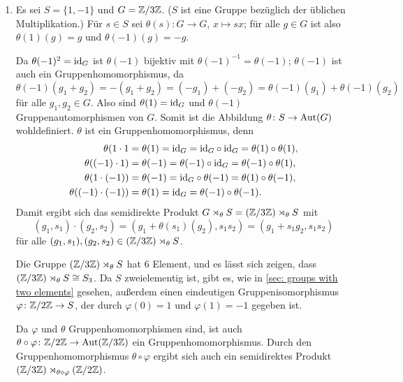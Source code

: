 \begin{bsp}
\begin{enumerate}[leftmargin=*]
  \item
   Es sei $S = \{1,-1\}$ und $G = \mathbb{Z}/3\mathbb{Z}$. ($S$ ist eine Gruppe bezüglich der üblichen Multiplikation.) Für $s \in S$ sei $\theta(s) \colon G \to G$, $x \mapsto sx$; für alle $g \in G$ ist also $\theta(1)(g) = g$ und $\theta(-1)(g) = -g$.
   
   Da $\theta(-1)^2 = \mathrm{id}_G$ ist $\theta(-1)$ bijektiv mit $\theta(-1)^{-1} = \theta(-1)$; $\theta(-1)$ ist auch ein Gruppenhomomorphismus, da
   \[
    \theta(-1)(g_1 + g_2)
    = -(g_1 + g_2)
    = (-g_1) + (-g_2)
    = \theta(-1)(g_1) + \theta(-1)(g_2)
   \]
   für alle $g_1, g_2 \in G$. Also sind $\theta(1) = \mathrm{id}_G$ und $\theta(-1)$ Gruppenautomorphismen von $G$. Somit ist die Abbildung $\theta \colon S \to \mathrm{Aut}(G)$ wohldefiniert. $\theta$ ist ein Gruppenhomomorphismus, denn
   \begin{align*}
    \theta(1 \cdot 1
    &= \theta(1)
    = \mathrm{id}_G
    = \mathrm{id}_G \circ \mathrm{id}_G
    = \theta(1) \circ \theta(1), \\
    \theta((-1) \cdot 1)
    &= \theta(-1)
    = \theta(-1) \circ \mathrm{id}_G
    = \theta(-1) \circ \theta(1), \\
    \theta(1 \cdot (-1))
    &= \theta(-1)
    = \mathrm{id}_G \circ \theta(-1)
    = \theta(1) \circ \theta(-1), \\
    \theta((-1) \cdot (-1))
    &= \theta(1)
    = \mathrm{id}_G
    = \theta(-1) \circ \theta(-1).
   \end{align*}
  Damit ergibt sich das semidirekte Produkt $G \rtimes_\theta S = (\mathbb{Z}/3\mathbb{Z}) \rtimes_\theta S$ mit
  \[
   (g_1, s_1) \cdot (g_2, s_2)
   = (g_1 + \theta(s_1)(g_2), s_1 s_2)
   = (g_1 + s_1 g_2, s_1 s_2)
  \]
  für alle $(g_1, s_1), (g_2, s_2) \in (\mathbb{Z}/3\mathbb{Z}) \rtimes_\theta S$.
  
  \begin{bem}
   Die Gruppe $(\mathbb{Z}/3\mathbb{Z}) \rtimes_\theta S$ hat $6$ Element, und es lässt sich zeigen, dass \mbox{$(\mathbb{Z}/3\mathbb{Z}) \rtimes_\theta S \cong S_3$}. Da $S$ zweielementig ist, gibt es, wie in \ref{sec: groups with two elements} gesehen, außerdem einen eindeutigen Gruppenisomorphismus $\varphi \colon \mathbb{Z}/2\mathbb{Z} \to S$, der durch $\varphi(0) = 1$ und $\varphi(1) = -1$ gegeben ist.
   
   Da $\varphi$ und $\theta$ Gruppenhomomorphismen sind, ist auch \mbox{$\theta \circ \varphi \colon \mathbb{Z}/2\mathbb{Z} \to \mathrm{Aut}(\mathbb{Z}/3\mathbb{Z})$} ein Gruppenhomomorphismus. Durch den Gruppenhomomorphismus $\theta \circ \varphi$ ergibt sich auch ein semidirektes Produkt \mbox{$(\mathbb{Z}/3\mathbb{Z}) \rtimes_{\theta \circ \varphi} (\mathbb{Z}/2\mathbb{Z})$}.
   

\end{bem}
\end{enumerate}
\end{bsp}
